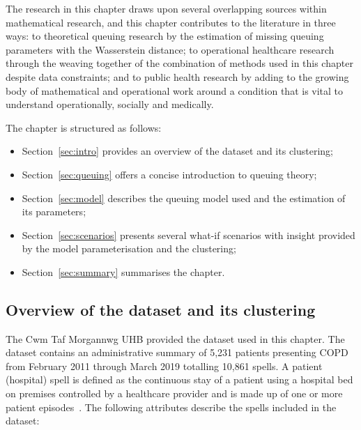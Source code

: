 The research in this chapter draws upon several overlapping sources within
mathematical research, and this chapter contributes to the literature in three
ways: to theoretical queuing research by the estimation of missing queuing
parameters with the Wasserstein distance; to operational healthcare research
through the weaving together of the combination of methods used in this chapter
despite data constraints; and to public health research by adding to the growing
body of mathematical and operational work around a condition that is vital to
understand operationally, socially and medically.

The chapter is structured as follows:

\begin{itemize}
    \item Section~\ref{sec:intro} provides an overview of the dataset and its
        clustering;
    \item Section~\ref{sec:queuing} offers a concise introduction to queuing
        theory;
    \item Section~\ref{sec:model} describes the queuing model used and the
        estimation of its parameters;
    \item Section~\ref{sec:scenarios} presents several what-if scenarios with
        insight provided by the model parameterisation and the clustering;
    \item Section~\ref{sec:summary} summarises the chapter.
\end{itemize}


\subsection{Overview of the dataset and its clustering}\label{subsec:overview}

The Cwm Taf Morgannwg UHB provided the dataset used in this chapter. The
dataset contains an administrative summary of 5,231 patients presenting COPD
from February 2011 through March 2019 totalling 10,861 spells. A patient
(hospital) spell is defined as the continuous stay of a patient using a hospital
bed on premises controlled by a healthcare provider and is made up of one or
more patient episodes~\cite{NHS:spell}. The following attributes describe the
spells included in the dataset:

